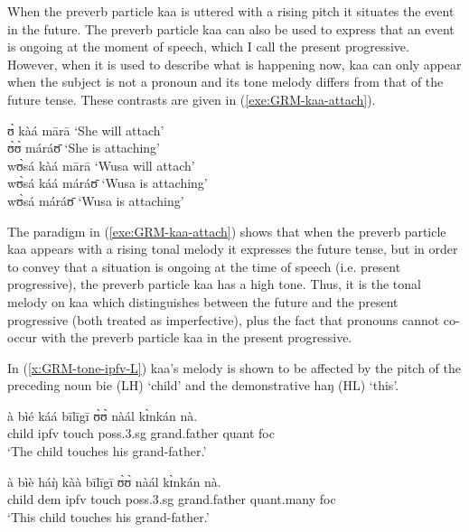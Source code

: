 \begin{exe}
\begin{exe}
\begin{exe}
{\begin{exe}
\begin{exe}
\begin{exe}
\begin{exe}
\begin{exe}
\begin{exe}
\begin{exe}
\begin{exe}
\begin{exe}
\begin{exe}
\begin{exe}
\begin{exe}
\begin{exe}
\begin{exe}
\begin{exe}
\begin{exe}
\begin{exe}
\begin{exe}
\begin{exe}
When the preverb particle {\sls kaa} is uttered with a rising pitch it situates 
the event in the future. The preverb particle {\sls kaa} can also be used to 
express that an event is
ongoing at the moment of speech, which I call the present 
progressive.   However,  when it is used to describe what is happening
now, {\sls kaa} can only appear when the subject is not a pronoun and its tone
melody differs from that of the future tense. These contrasts are given in
(\ref{exe:GRM-kaa-attach}).

\ea\label{exe:GRM-kaa-attach}
 ʊ̀ kàá mārā   {\rm `She will attach'}\\
   ʊ̀ʊ̀ máráʊ̄   {\rm  `She  is attaching'}\\
wʊ̀sá kàá mārā   {\rm  `Wusa will attach'}\\
wʊ̀sá káá   máráʊ̄  {\rm  `Wusa is attaching'}\\
\textasteriskcentered  wʊ̀sá   máráʊ̄   {\rm `Wusa is
attaching'}
\z

The paradigm in  (\ref{exe:GRM-kaa-attach}) shows that when the preverb 
particle {\sls kaa} appears with a rising tonal melody it  expresses the future 
tense, but  in
order to convey that a situation is ongoing at the time of speech (i.e. present
progressive), the preverb particle {\sls kaa} has a high tone. Thus, it is the
tonal melody on {\sls kaa} which distinguishes between the future and the 
present
progressive (both treated as imperfective),  plus the fact that pronouns cannot
co-occur with the preverb particle {\sls kaa} in the present progressive. 


In (\ref{x:GRM-tone-ipfv-L}) {\sls kaa}'s melody is shown to be affected by   
the 
pitch  of   the  preceding  noun {\sls bie} (LH) `child' and the demonstrative 
{\sls haŋ} (HL) `this'. 


\ea\label{x:GRM-tone-ipfv}
\ea\label{x:GRM-tone-ipfv-H}
\gll à bìé káá bīlīgī ʊ̀ʊ̀ nàál kɪ̀nkán nà.\\
{\art} child {\sc ipfv} touch {\sc poss.3.sg} grand.father {\sc quant} {\sc 
foc}\\
\glt `The child touches his grand-father.'

\ex\label{x:GRM-tone-ipfv-L}
\gll à bìè háŋ̀ kàà bīlīgī ʊ̀ʊ̀ nàál kɪ̀nkán nà.\\
{\art} child {\sc dem} {\sc ipfv} touch {\sc poss.3.sg} grand.father {\sc 
quant}.many  {\sc 
foc}\\
\glt `This child touches his grand-father.'

\z
\z




\end{exe}
\end{exe}
\end{exe}
\end{exe}
\end{exe}
\end{exe}
\end{exe}
\end{exe}
\end{exe}
\end{exe}
\end{exe}
\end{exe}
\end{exe}
\end{exe}
\end{exe}
\end{exe}
\end{exe}
\end{exe}
\end{exe}}
\end{exe}
\end{exe}
\end{exe}
